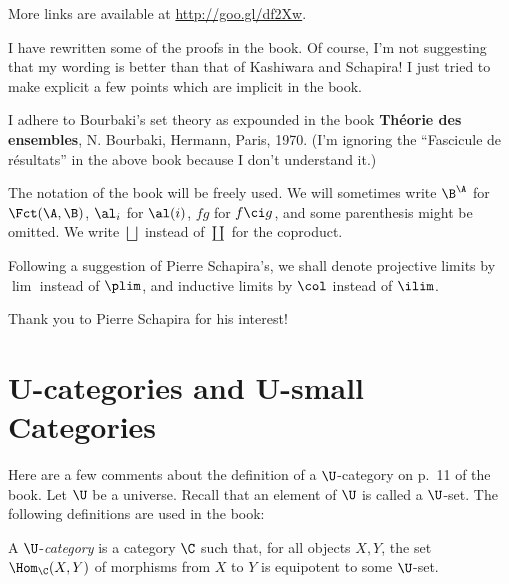 \documentclass[12pt]{article}
\theoremstyle{remark}
\theoremstyle{definition}
\begin{document}


More links are available at \href{http://goo.gl/df2Xw}{http://goo.gl/df2Xw}. 

I have rewritten some of the proofs in the book. Of course, I'm not suggesting that my wording is better than that of Kashiwara and Schapira! I just tried to make explicit a few points which are implicit in the book. 

I adhere to Bourbaki's set theory as expounded in the book \textbf{Théorie des ensembles}, N. Bourbaki, Hermann, Paris, 1970. (I'm ignoring the ``Fascicule de résultats'' in the above book because I don't understand it.) 

The notation of the book will be freely used. We will sometimes write $\B^\A$ for $\Fct(\A,\B)$, $\al_i$ for $\al(i)$, $fg$ for $f\ci g$, and some parenthesis might be omitted. We write $\bigsqcup$\index{$\bigsqcup$} instead of $\coprod$\index{$\coprod$} for the coproduct. 

Following a suggestion of Pierre Schapira's, we shall denote projective limits by $\lim$\index{$\lim$} instead of $\plim$\index{$\plim$}, and inductive limits by $\col$\index{$\col$} instead of $\ilim$\index{$\ilim$}. 

Thank you to Pierre Schapira for his interest!


\section{U-categories and U-small Categories}

Here are a few comments about the definition of a $\U$-category on p.~11 of the book. Let $\U$ be a universe. Recall that an element of $\U$ is called a $\U$-set. The following definitions are used in the book: 

\begin{df}[$\U$-category] 
A $\U$-{\em category} is a category $\C$ such that, for all objects $X,Y$, the set $\Hom_\C(X,Y)$ of morphisms from $X$ to $Y$ is equipotent to some $\U$-set. 
\end{df} 
\end{document}
